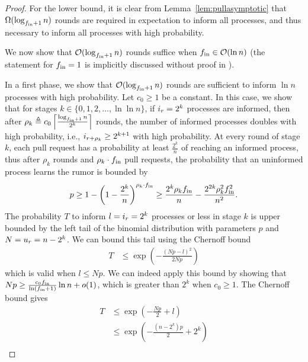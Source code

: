 \begin{proof}
  For the lower bound, it is clear from Lemma~\ref{lem:pullasymptotic} that $\Omega(\log_{f_\text{in}+1} n)$ rounds are required in expectation to inform all processes, and thus necessary to inform all processes with high probability.

  We now show that $\mathcal{O}(\log_{f_\text{in} + 1} n)$ rounds suffice when
  $f_\text{in} \in \mathcal{O}(\ln n)$ (the statement for $f_\text{in} = 1$ is implicitly discussed without proof in \cite{DBLP:conf/focs/KarpSSV00}). 

  In a first phase, we show that $\mathcal{O}(\log_{f_\text{in}+1}n)$ rounds are sufficient to inform $\ln n$ processes with high probability. Let $c_0 \geq 1$ be a constant. In this case, we show that for stages $k \in \{0,1,2,\dots,\ln\ln n\}$, if $i_{r} = 2^k$ processes are informed, then after $\rho_k \triangleq c_0\left\lceil \frac{\log_{f_\text{in} + 1} n}{2^k} \right \rceil$ rounds, the number of informed processes doubles with high probability, i.e., $i_{r+\rho_k} \geq 2^{k+1}$ with high probability. At every round of stage $k$, each pull request has a probability at least $\frac{2^k}{n}$ of reaching an informed process, thus after $\rho_k$ rounds and $\rho_k \cdot f_\text{in}$ pull requests, the probability that an uninformed process learns the rumor is bounded by
  \begin{align}
  p \geq 1 - \left( 1 - \frac{2^k}{n} \right)^{\rho_k \cdot f_\text{in}} \geq \frac{2^k\rho_kf_\text{in}}{n}-\frac{2^{2k}\rho_k^2f_\text{in}^2}{n^2}.    
  \end{align}
  The probability $T$ to inform $l=i_{r}=2^k$ processes or less in stage $k$ is upper bounded by the left tail of the binomial distribution with parameters $p$ and $N = u_{r} = n-2^k$. We can bound this tail using the Chernoff bound
  \begin{align}
    \label{eq:chernoffbinomial}
       T & \leq \exp\left(-\frac{(Np-l)^2}{2Np}\right)
  \end{align}
  which is valid when $l \leq N p$. We can indeed apply this bound by showing that $Np \geq \frac{c_0 f_\text{in}}{\ln(f_\text{in} + 1)} \ln n + o(1)$, which is greater than $2^k$ when $c_0 \geq 1$. The Chernoff bound gives
  \begin{equation}
       \begin{split}
     \label{eq:3}
      T 
     & \leq \exp\left(-\frac{Np}{2}+l\right) \\
        & \leq \exp \left(-\frac{(n-2^k)p}{2} + 2^{k}\right) \\     

\end{split}
\end{equation}
\end{proof}
